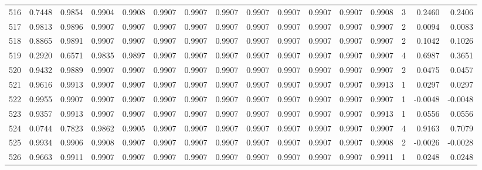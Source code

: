 \begin{tabular}{lrrrrrrrrrrrrrrr}
516 &      0.7448 &  0.9854 &  0.9904 &  0.9908 &  0.9907 &  0.9907 &  0.9907 &  0.9907 &  0.9907 &  0.9907 &   0.9907 &     0.9908 &      3 &                    0.2460 &                     0.2406 \\
517 &      0.9813 &  0.9896 &  0.9907 &  0.9907 &  0.9907 &  0.9907 &  0.9907 &  0.9907 &  0.9907 &  0.9907 &   0.9907 &     0.9907 &      2 &                    0.0094 &                     0.0083 \\
518 &      0.8865 &  0.9891 &  0.9907 &  0.9907 &  0.9907 &  0.9907 &  0.9907 &  0.9907 &  0.9907 &  0.9907 &   0.9907 &     0.9907 &      2 &                    0.1042 &                     0.1026 \\
519 &      0.2920 &  0.6571 &  0.9835 &  0.9897 &  0.9907 &  0.9907 &  0.9907 &  0.9907 &  0.9907 &  0.9907 &   0.9907 &     0.9907 &      4 &                    0.6987 &                     0.3651 \\
520 &      0.9432 &  0.9889 &  0.9907 &  0.9907 &  0.9907 &  0.9907 &  0.9907 &  0.9907 &  0.9907 &  0.9907 &   0.9907 &     0.9907 &      2 &                    0.0475 &                     0.0457 \\
521 &      0.9616 &  0.9913 &  0.9907 &  0.9907 &  0.9907 &  0.9907 &  0.9907 &  0.9907 &  0.9907 &  0.9907 &   0.9907 &     0.9913 &      1 &                    0.0297 &                     0.0297 \\
522 &      0.9955 &  0.9907 &  0.9907 &  0.9907 &  0.9907 &  0.9907 &  0.9907 &  0.9907 &  0.9907 &  0.9907 &   0.9907 &     0.9907 &      1 &                   -0.0048 &                    -0.0048 \\
523 &      0.9357 &  0.9913 &  0.9907 &  0.9907 &  0.9907 &  0.9907 &  0.9907 &  0.9907 &  0.9907 &  0.9907 &   0.9907 &     0.9913 &      1 &                    0.0556 &                     0.0556 \\
524 &      0.0744 &  0.7823 &  0.9862 &  0.9905 &  0.9907 &  0.9907 &  0.9907 &  0.9907 &  0.9907 &  0.9907 &   0.9907 &     0.9907 &      4 &                    0.9163 &                     0.7079 \\
525 &      0.9934 &  0.9906 &  0.9908 &  0.9907 &  0.9907 &  0.9907 &  0.9907 &  0.9907 &  0.9907 &  0.9907 &   0.9907 &     0.9908 &      2 &                   -0.0026 &                    -0.0028 \\
526 &      0.9663 &  0.9911 &  0.9907 &  0.9907 &  0.9907 &  0.9907 &  0.9907 &  0.9907 &  0.9907 &  0.9907 &   0.9907 &     0.9911 &      1 &                    0.0248 &                     0.0248 \\

\end{tabular}
